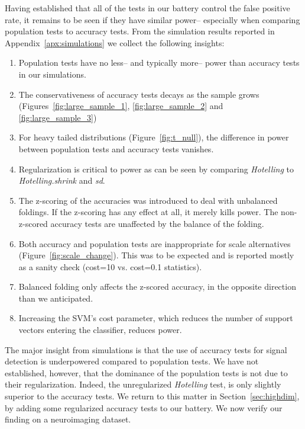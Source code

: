 \documentclass[12pt,a4paper]{article}
\theoremstyle{definition}
\begin{document}
Having established that all of the tests in our battery control the false positive rate, it remains to be seen if they have similar power-- 
especially when comparing population tests to accuracy tests. 
From the simulation results reported in Appendix~\ref{apx:simulations} we collect the following insights:
\begin{enumerate}
\item Population tests have no less-- and typically more-- power than accuracy tests in our simulations.

\item The conservativeness of accuracy tests decays as the sample grows (Figures~\ref{fig:large_sample_1}, \ref{fig:large_sample_2} and \ref{fig:large_sample_3})

\item For heavy tailed distributions (Figure~\ref{fig:t_null}), the difference in power between population tests and accuracy tests vanishes. 

\item Regularization is critical to power as can be seen by comparing \emph{Hotelling} to \emph{Hotelling.shrink} and \emph{sd}.

\item The z-scoring of the accuracies was introduced to deal with unbalanced foldings. 
If the z-scoring has any effect at all, it merely kills power.
The non-z-scored accuracy tests are unaffected by the balance of the folding.

\item Both accuracy and population tests are inappropriate for scale alternatives (Figure~\ref{fig:scale_change}). 
This was to be expected and is reported mostly as a sanity check (cost=10 vs. cost=0.1 statistics).

\item Balanced folding only affects the z-scored accuracy, in the opposite direction than we anticipated. 

\item Increasing the SVM's cost parameter, which reduces the number of support vectors entering the classifier, reduces power. 

\end{enumerate}


The major insight from simulations is that the use of accuracy tests for signal detection is underpowered compared to population tests. 
We have not established, however, that the dominance of the population tests is not due to their regularization. Indeed, the unregularized \emph{Hotelling} test, is only slightly superior to the accuracy tests. 
We return to this matter in Section~\ref{sec:highdim}, by adding some regularized accuracy tests to our battery. 
We now verify our finding on a neuroimaging dataset.
\end{document}
